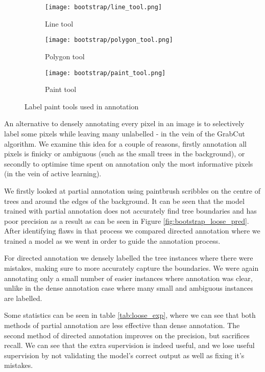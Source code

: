 \begin{figure}
\centering
\begin{subfigure}[t]{.15\textwidth}
  \centering
  \texttt{[image: bootstrap/line\_tool.png]}
  \caption{Line tool}
\end{subfigure}%
\begin{subfigure}[t]{.15\textwidth}
  \centering
  \texttt{[image: bootstrap/polygon\_tool.png]}
  \caption{Polygon tool}
\end{subfigure}%
\begin{subfigure}[t]{.15\textwidth}
  \centering
  \texttt{[image: bootstrap/paint\_tool.png]}
  \caption{Paint tool}
\end{subfigure}%

  \caption{Label paint tools used in annotation}
  \label{fig:bootstrap_tools}

\end{figure}



An alternative to densely annotating every pixel in an image is to selectively label some pixels while leaving many unlabelled - in the vein of the GrabCut algorithm. We examine this idea for a couple of reasons, firstly annotation all pixels is finicky or ambiguous (such as the small trees in the background), or secondly to optimise time spent on annotation only the most informative pixels (in the vein of active learning).

We firstly looked at partial annotation using paintbrush scribbles on the centre of trees and around the edges of the background. It can be seen that the model trained with partial annotation does not accurately find tree boundaries and has poor precision as a result as can be seen in Figure \ref{fig:bootstrap_loose_pred}. After identifying flaws in that process we compared directed annotation where we trained a model as we went in order to guide the annotation process.

For directed annotation we densely labelled the tree instances where there were mistakes, making sure to more accurately capture the boundaries. We were again annotating only a small number of easier instances where annotation was clear, unlike in the dense annotation case where many small and ambiguous instances are labelled.

Some statistics can be seen in table \ref{tab:loose_exp}, where we can see that both methods of partial annotation are less effective than dense annotation. The second method of directed annotation improves on the precision, but sacrifices recall. We can see that the extra supervision is indeed useful, and we lose useful supervision by not validating the model's correct output as well as fixing it's mistakes.


